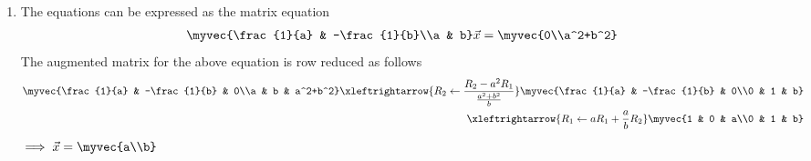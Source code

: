 \begin{enumerate}
\item
The equations can be expressed as the matrix equation
\begin{align}
\myvec{\frac{1}{a} & -\frac{1}{b}\\a & b} \vec{x} = \myvec{0\\a^2+b^2}
\end{align}
%
The augmented matrix for the above equation is row reduced as follows
\begin{align}
\myvec{\frac{1}{a} & -\frac{1}{b} & 0\\a & b & a^2+b^2} 
\xleftrightarrow {R_2\leftarrow \frac{R_2-a^{2}R_1}{\frac{a^2+b^2}{b}}}\myvec{\frac{1}{a} & -\frac{1}{b} & 0\\0 & 1 & b}
\\
\xleftrightarrow {R_1\leftarrow aR_1 +\frac{a}{b} R_2}\myvec{1 & 0 & a\\0 & 1 & b} 
\label{eq:3.12.1_line_aug2}
\end{align}
%
$\implies \vec{x}=\myvec{a\\b}$
\end{enumerate}

